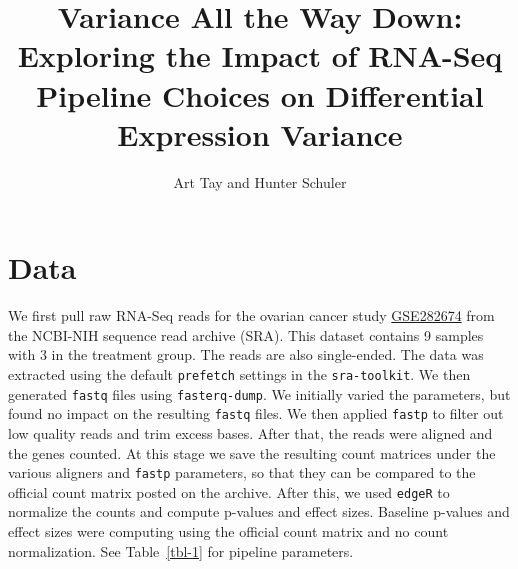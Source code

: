 \documentclass[
  letterpaper,
]{article}
\title{\textbf{Variance All the Way Down:} Exploring the Impact of
RNA-Seq Pipeline Choices on Differential Expression Variance}
\author{Art Tay and Hunter Schuler}
\date{}
\begin{document}
\maketitle


\section{Data}\label{data}

We first pull raw RNA-Seq reads for the ovarian cancer study
\href{https://www.ncbi.nlm.nih.gov/geo/query/acc.cgi?acc=GSE282674}{GSE282674}
from the NCBI-NIH sequence read archive (SRA). This dataset contains 9
samples with 3 in the treatment group. The reads are also single-ended.
The data was extracted using the default \texttt{prefetch} settings in
the \texttt{sra-toolkit}. We then generated \texttt{fastq} files using
\texttt{fasterq-dump}. We initially varied the parameters, but found no
impact on the resulting \texttt{fastq} files. We then applied
\texttt{fastp} to filter out low quality reads and trim excess bases.
After that, the reads were aligned and the genes counted. At this stage
we save the resulting count matrices under the various aligners and
\texttt{fastp} parameters, so that they can be compared to the official
count matrix posted on the archive. After this, we used \texttt{edgeR}
to normalize the counts and compute p-values and effect sizes. Baseline
p-values and effect sizes were computing using the official count matrix
and no count normalization. See Table~\ref{tbl-1} for pipeline
parameters.
\end{document}
